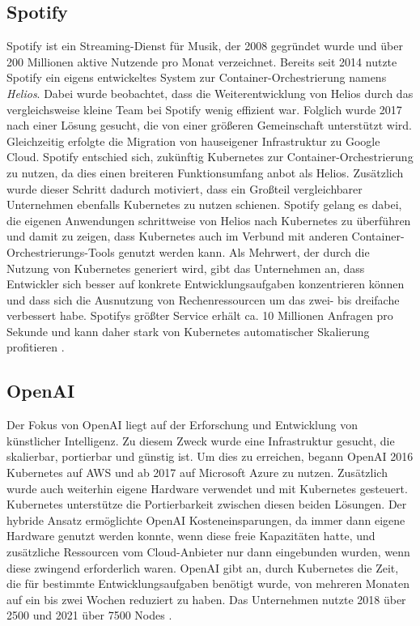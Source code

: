 \documentclass[11pt,a4paper]{article}
\begin{document}
\subsection{Spotify}
Spotify ist ein Streaming-Dienst für Musik, der 2008 gegründet wurde
und über 200 Millionen aktive Nutzende pro Monat verzeichnet.
Bereits seit 2014 nutzte Spotify ein eigens entwickeltes System zur Container-Orchestrierung
namens \emph{Helios}. Dabei wurde beobachtet, dass die Weiterentwicklung von Helios
durch das vergleichsweise kleine Team bei Spotify wenig effizient war.
Folglich wurde 2017 nach einer Lösung gesucht, die von einer größeren Gemeinschaft
unterstützt wird. Gleichzeitig erfolgte die Migration von hauseigener Infrastruktur
zu Google Cloud. Spotify entschied sich, zukünftig Kubernetes zur Container-Orchestrierung zu nutzen,
da dies einen breiteren Funktionsumfang anbot als Helios.
Zusätzlich wurde dieser Schritt dadurch motiviert, dass ein Großteil
vergleichbarer Unternehmen ebenfalls Kubernetes zu nutzen schienen.
Spotify gelang es dabei, die eigenen Anwendungen schrittweise
von Helios nach Kubernetes zu überführen und damit zu zeigen, dass Kubernetes
auch im Verbund mit anderen Container-Orchestrierungs-Tools genutzt werden kann.
Als Mehrwert, der durch die Nutzung von Kubernetes generiert wird,
gibt das Unternehmen an, dass Entwickler sich besser auf konkrete Entwicklungsaufgaben
konzentrieren können und dass sich die Ausnutzung von Rechenressourcen
um das zwei- bis dreifache verbessert habe.
Spotifys größter Service erhält ca. 10 Millionen Anfragen pro Sekunde
und kann daher stark von Kubernetes automatischer Skalierung profitieren \cite{story_spotify}.

\subsection{OpenAI}
\label{sec:openai}
Der Fokus von OpenAI liegt auf der Erforschung und Entwicklung von künstlicher Intelligenz.
Zu diesem Zweck wurde eine Infrastruktur gesucht, die skalierbar, portierbar und günstig ist.
Um dies zu erreichen, begann \mbox{OpenAI} 2016 Kubernetes auf AWS und ab 2017 auf
Microsoft Azure zu nutzen. Zusätzlich wurde auch weiterhin eigene Hardware verwendet
und mit Kubernetes gesteuert.
Kubernetes unterstütze die Portierbarkeit zwischen diesen beiden Lösungen.
Der hybride Ansatz ermöglichte OpenAI Kosteneinsparungen,
da immer dann eigene Hardware genutzt werden konnte, wenn diese freie Kapazitäten hatte,
und zusätzliche Ressourcen vom Cloud-Anbieter nur dann eingebunden wurden,
wenn diese zwingend erforderlich waren.
OpenAI gibt an, durch Kubernetes die Zeit, die für bestimmte Entwicklungsaufgaben
benötigt wurde, von mehreren Monaten auf ein bis zwei Wochen reduziert zu haben.
Das Unternehmen nutzte 2018 über 2500 \cite{openai_scaling_2500} und 2021 über 7500 Nodes \cite{openai_scaling_7500} \cite{story_openai}.
\end{document}
